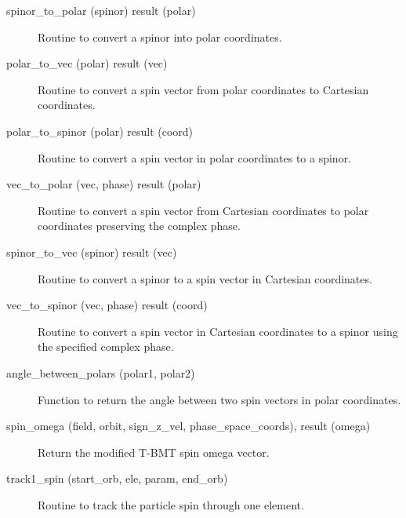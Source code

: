 \begin{description}

\label{r:spinor.to.polar}
\item[spinor_to_polar (spinor) result (polar)] \Newline 
Routine to convert a spinor into polar coordinates.

\label{r:polar.to.vec}
\item[polar_to_vec (polar) result (vec)] \Newline
Routine to convert a spin vector from polar coordinates to Cartesian coordinates.

\label{r:polar.to.spinor}
\item[polar_to_spinor (polar) result (coord)] \Newline
Routine to convert a spin vector in polar coordinates to a spinor.

\label{r:vec.to.polar}
\item[vec_to_polar (vec, phase) result (polar)] \Newline
Routine to convert a spin vector from Cartesian coordinates to polar coordinates 
preserving the complex phase.

\label{r:spinor.to.vec}
\item[spinor_to_vec (spinor) result (vec)] \Newline
Routine to convert a spinor to a spin vector in Cartesian coordinates.

\label{r:vec.to.spinor}
\item[vec_to_spinor (vec, phase) result (coord)] \Newline
Routine to convert a spin vector in Cartesian coordinates to a spinor using
the specified complex phase.

\label{r:angle.between.polars}
\item[angle_between_polars (polar1, polar2)] \Newline
Function to return the angle between two spin vectors in polar coordinates.

\label{r:spin.omega}
\item[spin_omega (field, orbit, sign_z_vel, phase_space_coords), result (omega)] \Newline 
Return the modified T-BMT spin omega vector.

\label{r:track1.spin}
\item[track1_spin (start_orb, ele, param, end_orb)] \Newline
Routine to track the particle spin through one element.

\end{description}

